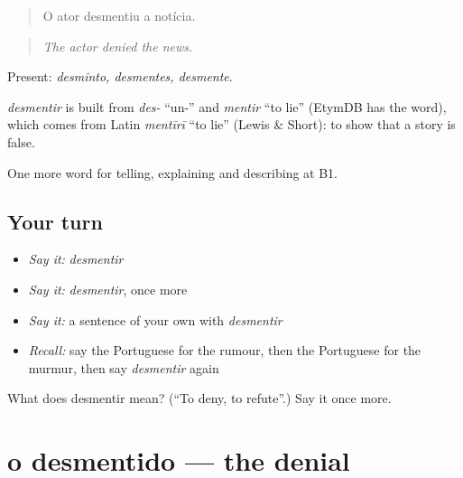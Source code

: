 \begin{quote}
O ator desmentiu a notícia.
\end{quote}

\begin{quote}
\emph{The actor denied the news.}
\end{quote}

Present: \emph{desminto, desmentes, desmente}.

\begin{cousinweb}
\emph{desmentir} is built from \emph{des-} \textquotedblleft{}un-\textquotedblright{} and \emph{mentir} \textquotedblleft{}to lie\textquotedblright{} (EtymDB has the word), which comes from Latin \emph{mentīrī} \textquotedblleft{}to lie\textquotedblright{} (Lewis \& Short): to show that a story is false.
\end{cousinweb}

\begin{grammarlens}[title={What you've built}]
One more word for telling, explaining and describing at B1.
\end{grammarlens}

\subsection*{Your turn}
\begin{itemize}
\raggedright
  \item \emph{Say it:} \emph{desmentir}
  \item \emph{Say it:} \emph{desmentir}, once more
  \item \emph{Say it:} a sentence of your own with \emph{desmentir}
  \item \emph{Recall:} say the Portuguese for the rumour, then the Portuguese for the murmur, then say \emph{desmentir} again
\end{itemize}

\begin{tcolorbox}[breakable,colback=teal!4,colframe=teal!35!black,title={Before you move on}]
What does desmentir mean? (\textquotedblleft{}To deny, to refute\textquotedblright{}.) Say it once more.
\end{tcolorbox}
\section[o desmentido]{o desmentido — the denial}

\label{lesson:PT-C283-desmentido}




